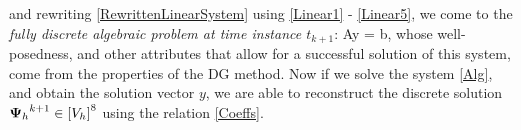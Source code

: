 and rewriting \ref{RewrittenLinearSystem} using \ref{Linear1} - \ref{Linear5}, we come to the \textit{fully discrete algebraic problem at time instance $t_{k+1}$}:
\be
\label{Alg} Ay = b,
\ee
whose well-posedness, and other attributes that allow for a successful solution of this system, come from the properties of the DG method.
Now if we solve the system \ref{Alg}, and obtain the solution vector $y$, we are able to reconstruct the discrete solution ${\mathrm{\mathbf{\Psi}}_h}^{k+1} \in \left[V_h\right]^8$ using the relation \ref{Coeffs}.
